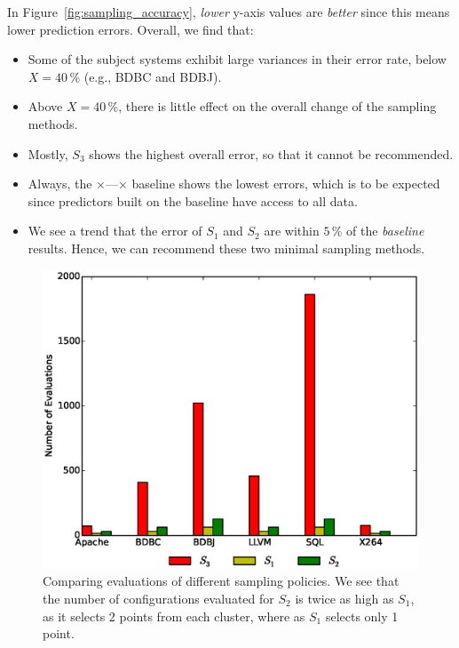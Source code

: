 \documentclass[smallextended]{svjour3}       %
\newcommand{\fig}[1]{Figure~\ref{fig:#1}}
\newcommand{\what}{{\bf WHAT}\xspace}
\begin{document}

In \fig{sampling_accuracy}, {\em lower} y-axis values  are {\em better} since this means lower
prediction errors. Overall, we find that:
\begin{itemize}

\item Some of the subject systems exhibit large variances in their error rate, below $X=40$\,\% (e.g., BDBC and BDBJ).
\item Above $X=40$\,\%, there is little effect on the overall change of the sampling methods.
\item
Mostly, $S_3$ shows the highest overall error, 
so that it cannot be recommended.
\item Always, the   $\times$\hspace{-2pt}---\hspace{-2pt}$\times$ baseline shows the lowest errors, which is to be
expected since predictors built on the baseline have access to all data.
\item
We see a trend that the error of  $S_1$ and $S_2$ are within $5$\,\% of the {\em baseline} results.
Hence, we can recommend these two minimal sampling methods.
\end{itemize}

\begin{figure}[t]
\centering
\includegraphics[width=0.75\columnwidth]{Figures/evaluation_graph}
\caption{Comparing evaluations of different sampling policies. We see that the number of configurations evaluated for $S_2$ is twice as high as $S_1$, as it selects 2 points from each cluster, where as  $S_1$ selects only 1 point. }\label{fig:Evaluations}
\end{figure}
\end{document}
